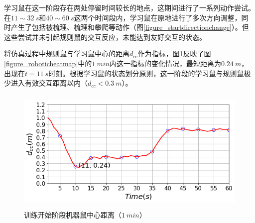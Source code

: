 学习鼠在这一阶段存在两处停留时间较长的地点，这期间进行了一系列动作尝试。在$11\sim32~s$和$40\sim60~s$这两个时间段内，学习鼠在原地进行了多次方向调整，同时产生了包括被梳理、梳理和攀爬等动作（图\ref{figure_startdirectionchange}）。但这些尝试并未引起规则鼠的交互反应，未能达到友好交互的状态。

将仿真过程中规则鼠与学习鼠中心的距离$d_{cc}$作为指标，图\ref{figure_roboticdistance}反映了图\ref{figure_roboticheatmap}中的$1~min$内这一指标的变化情况，最短距离为$0.24~m$，出现在$t=11~s$时刻。根据学习鼠的状态划分原则，这一阶段的学习鼠与规则鼠极少进入有效交互距离以内（$d_{cc}<0.3~m$）。
\begin{figure}[htbp]
  \vspace{13pt}
  \centering
  \includegraphics[height=6cm]{images/ch05/start/distance.png}
  \caption{训练开始阶段机器鼠中心距离（$1~min$）}\label{figure_roboticdistance}
\end{figure}

